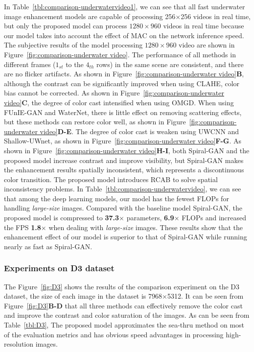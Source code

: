 \documentclass[utf8]{FrontiersinHarvard} %
\begin{document}
In Table~\ref{tbl:comparison-underwatervideo1}, we can see that all fast underwater image enhancement models are capable of processing 256$\times$256 videos in real time, but only the proposed model can process $1280\times960$ videos in real time because our model takes into account the effect of MAC on the network inference speed. The subjective results of the model processing $1280\times960$ video are shown in Figure~\ref{fig:comparison-underwater video}. The performance of all methods in different frames ($1_{st}$ to the $4_{th}$ rows) in the same scene are consistent, and there are no flicker artifacts. As shown in Figure~\ref{fig:comparison-underwater video}\textbf{B}, although the contrast can be significantly improved when using CLAHE, color bias cannot be corrected. As shown in Figure~\ref{fig:comparison-underwater video}\textbf{C}, the degree of color cast intensified when using OMGD. When using FUnIE-GAN and WaterNet, there is little effect on removing scattering effects, but these methods can restore color well, as shown in Figure~\ref{fig:comparison-underwater video}\textbf{D-E}. The degree of color cast is weaken using UWCNN and Shallow-UWnet, as shown in Figure~\ref{fig:comparison-underwater video}\textbf{F-G}. As shown in Figure~\ref{fig:comparison-underwater video}\textbf{H-I}, both Spiral-GAN and the proposed model increase contrast and improve visibility, but Spiral-GAN makes the enhancement results spatially inconsistent, which represents a discontinuous color transition. The proposed model introduces RCAB to solve spatial inconsistency problems. In Table~\ref{tbl:comparison-underwatervideo}, we can see that among the deep learning models, our model has the fewest FLOPs for handling \textit{large-size} images. Compared with the baseline model Spiral-GAN, the proposed model is compressed to \textbf{37.3}$\times$ parameters, \textbf{6.9}$\times$ FLOPs and increased the FPS \textbf{1.8}$\times$ when dealing with \textit{large-size} images. These results show that the enhancement effect of our model is superior to that of Spiral-GAN while running nearly as fast as Spiral-GAN.

\subsubsection{Experiments on D3 dataset}
{The Figure~\ref{fig:D3} shows the results of the comparison experiment on the D3 dataset, the size of each image in the dataset is 7968$\times$5312. It can be seen from Figure~\ref{fig:D3}\textbf{B-D} that all three methods can effectively remove the color cast and improve the contrast and color saturation of the images. As can be seen from Table~\ref{tbl:D3}, The proposed model approximates the sea-thru method on most of the evaluation metrics and has obvious speed advantages in processing high-resolution images.}
\end{document}
